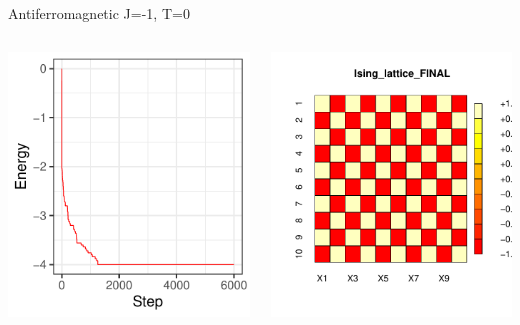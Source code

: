 \documentclass{beamer}
\begin{document}
\begin{frame}{Antiferromagnetic J=-1, T=0}
\begin{columns}
\begin{column}{0.5\textwidth}
    \begin{center}
     \includegraphics[width=\textwidth]{Pic/J-1_10_6000_T=0_ENERGY.pdf}
     \end{center}
\end{column}
\begin{column}{0.5\textwidth}
    \begin{center}
     \includegraphics[width=\textwidth]{Pic/J-1_10_6000_T=0_FINAL.pdf}

\end{center}
\end{column}
\end{columns}
\end{frame}
\end{document}
